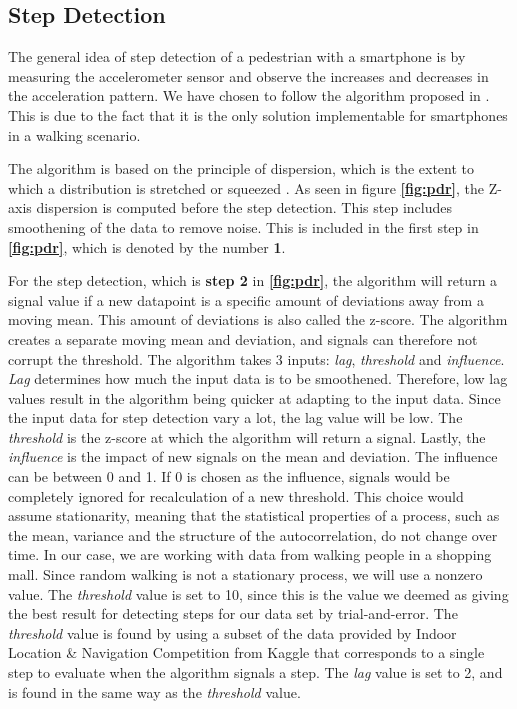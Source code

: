 
\subsection{Step Detection}

The general idea of step detection of a pedestrian with a smartphone is by measuring the accelerometer sensor and observe the increases and decreases in the acceleration pattern\cite{HybridPositioningPaper}. We have chosen to follow the algorithm proposed in \cite{peakdetection}. This is due to the fact that it is the only solution implementable for smartphones in a walking scenario.

The algorithm is based on the principle of dispersion, which is the extent to which a distribution is stretched or squeezed \cite{dispersion}. As seen in figure \textbf{\autoref{fig:pdr}}, the Z-axis dispersion is computed before the step detection. This step includes smoothening of the data to remove noise. This is included in the first step in \textbf{\autoref{fig:pdr}}, which is denoted by the number \textbf{1}.

For the step detection, which is \textbf{step 2} in \textbf{\autoref{fig:pdr}}, the algorithm will return a signal value if a new datapoint is a specific amount of deviations away from a moving mean. This amount of deviations is also called the z-score. The algorithm creates a separate moving mean and deviation, and signals can therefore not corrupt the threshold. The algorithm takes 3 inputs: \textit{lag}, \textit{threshold} and \textit{influence}. \textit{Lag} determines how much the input data is to be smoothened. Therefore, low lag values result in the algorithm being quicker at adapting to the input data. Since the input data for step detection vary a lot, the lag value will be low. The \textit{threshold} is the z-score at which the algorithm will return a signal. Lastly, the \textit{influence} is the impact of new signals on the mean and deviation. The influence can be between 0 and 1. If 0 is chosen as the influence, signals would be completely ignored for recalculation of a new threshold. This choice would assume stationarity, meaning that the statistical properties of a process, such as the mean, variance and the structure of the autocorrelation, do not change over time\cite{stationarity}. In our case, we are working with data from walking people in a shopping mall. Since random walking is not a stationary process, we will use a nonzero value\cite{peakdetection}. The \textit{threshold} value is set to 10, since this is the value we deemed as giving the best result for detecting steps for our data set by trial-and-error. The \textit{threshold} value is found by using a subset of the data provided by Indoor Location \& Navigation Competition from Kaggle that corresponds to a single step to evaluate when the algorithm signals a step. The \textit{lag} value is set to 2, and is found in the same way as the \textit{threshold} value.

